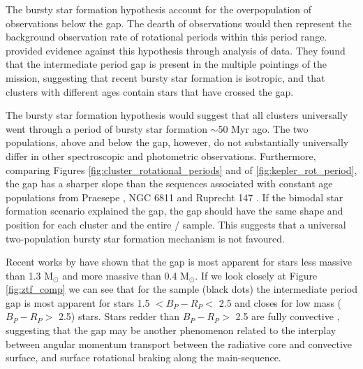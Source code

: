 The bursty star formation hypothesis  account for the overpopulation of observations below the gap. 
The dearth of observations would then represent the background observation rate of rotational periods within this period range.
\citet{gordon_stellar_2021} provided evidence against this hypothesis through analysis of \ktoo{} data.
They found that the intermediate period gap is present in the multiple pointings of the \ktoo{} mission, suggesting that recent bursty star formation is isotropic, and that clusters with different ages contain stars that have crossed the gap.

The bursty star formation hypothesis would suggest that all clusters universally went through a period of bursty star formation $\sim$50 Myr ago. 
The two populations, above and below the gap, however, do not substantially universally differ in other spectroscopic and photometric observations.
Furthermore, comparing Figures \ref{fig:cluster_rotational_periods} and of \ref{fig:kepler_rot_period}, the gap has a sharper slope than the sequences associated with constant age populations from Praesepe \citep{douglas_poking_2017,douglas_k2_2019}, NGC 6811 \citep{curtis_temporary_2019} and Ruprecht 147 \citep{curtis_when_2020}. 
If the bimodal star formation scenario explained the gap, the gap should have the same shape and position for each cluster and the entire \ktoo/\kepler{} sample.
This suggests that a universal two-population bursty star formation mechanism is not favoured.

Recent works by \citet{lu_bridging_2022} have shown that the gap is most apparent for stars less massive than 1.3 M$_{\odot}$ and more massive than 0.4 M$_{\odot}$.
If we look closely at Figure \ref{fig:ztf_comp} we can see that for the \ZTF{} sample (black dots) the intermediate period gap is most apparent for stars 1.5 $<B_P-R_P <$ 2.5 and closes for low mass ($B_P-R_P >$ 2.5) stars.
Stars redder than $B_P-R_P >$ 2.5 are fully convective \citep{amard_first_2019}, suggesting that the gap may be another phenomenon related to the interplay between angular momentum transport between the radiative core and convective surface, and surface rotational braking along the main-sequence.

